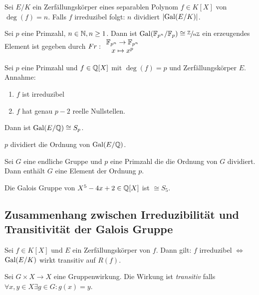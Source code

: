 \begin{corollary}
	Sei $E / K$ ein Zerfällungskörper eines separablen Polynom $f \in K[X]$ von $\deg(f) = n$. 
	Falls $f$ irreduzibel folgt: $n$ dividiert $\abs{\operatorname{Gal}(E/K)}$.
\end{corollary}


\begin{theorem}
	Sei $p$ eine Primzahl, $n \in \mathbb{N}, n \geq 1$. Dann ist $\operatorname{Gal}(\mathbb{F}_{p^{n}} / \mathbb{F}_{p}) \cong \sfrac{\mathbb{Z}}{n \mathbb{Z}}$ 
	ein erzeugendes Element ist gegeben durch $Fr:\begin{array}{c} \mathbb{F}_{p^{n}} \to \mathbb{F}_{p^{n}}\\ x \mapsto x^{p}\\ \end{array}$
\end{theorem}


\begin{theorem}
	Sei $p$ eine Primzahl und $f \in \mathbb{Q}[X]$ mit $\deg(f) = p$ und Zerfällungskörper $E$. Annahme:
	\begin{enumerate}
		\item $f$ ist irreduzibel
		\item $f$ hat genau $p-2$ reelle Nullstellen.
	\end{enumerate}
	Dann ist $\operatorname{Gal}(E / \mathbb{Q}) \cong S_{p}$.
\end{theorem}

\begin{corollary}
	$p$ dividiert die Ordnung von $\operatorname{Gal}(E / \mathbb{Q})$.
\end{corollary}

\begin{lemma}[Cauchy]
	Sei $G$ eine endliche Gruppe und $p$ eine Primzahl die die Ordnung von $G$ dividiert.
	Dann enthält $G$ eine Element der Ordnung $p$.
\end{lemma}



\begin{corollary}
	Die Galois Gruppe von $X^{5} - 4x + 2 \in \mathbb{Q}[X]$ ist $\cong S_{5}$.
\end{corollary}


\subsection{Zusammenhang zwischen Irreduzibilität und Transitivität der Galois Gruppe}
\begin{corollary}
	Sei $f \in K[X]$ und $E$ ein Zerfällungskörper von $f$.
	Dann gilt: $f$ irreduzibel $\Leftrightarrow$ $\operatorname{Gal}(E / K)$ wirkt transitiv auf $R(f)$.
\end{corollary}

Sei $G \times X \to X$ eine Gruppenwirkung. Die Wirkung ist \emph{transitiv} falls $\forall x,y \in X \exists g \in G : g(x) = y$.

